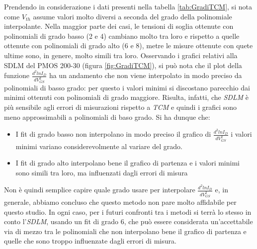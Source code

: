 \documentclass[12pt, letterpaper]{book}
\begin{document}
Prendendo in considerazione i dati presenti nella tabella \ref{tab:GradiTCM}, si nota come $V_{th}$ assume valori molto diversi a seconda del grado della polinomiale interpolante. Nella maggior parte dei casi, le tensioni di soglia ottenute con polinomiali di grado basso (2 e 4) cambiano molto tra loro e rispetto a quelle ottenute con polinomiali di grado alto (6 e 8), metre le misure ottenute con quete ultime sono, in genere, molto simili tra loro. Osservando i grafici relativi alla SDLM del PMOS 200-30 (figura \ref{fig:GradiTCM}), si può nota che il plot della funzione $\frac{d^2lnI_D}{dV_{GS}^2}$ ha un andamento che non viene interpolato in modo preciso da polinomiali di basso grado: per questo i valori minimi si discostano parecchio dai minimi ottenuti con polinomiali di grado maggiore. Risulta, infatti, che \emph{SDLM} è più sensibile agli errori di misurazioni rispetto a \emph{TCM} e quindi i grafici sono meno approssimabili a polinomiali di baso grado. Si ha dunque che:
\begin{itemize}
  \item I fit di grado basso non interpolano in modo preciso il grafico di $\frac{d^2lnI_D}{dV_{GS}^2}$ i valori minimi variano considerevolmente al variare del grado.
  \item I fit di grado alto interpolano bene il grafico di partenza e i valori minimi sono simili tra loro, ma influenzati dagli errori di misura
\end{itemize}

Non è quindi semplice capire quale grado usare per interpolare $\frac{d^2lnI_D}{dV_{GS}^2}$ e, in generale, abbiamo concluso che questo metodo non pare molto affidabile per questo studio. In ogni caso, per i futuri confronti tra i metodi si terrà lo stesso in conto l'\emph{SDLM}, usando un fit di grado 6, che può essere considerata un'accettabile via di mezzo tra le polinomiali che non interpolano bene il grafico di partenza e quelle che sono troppo influenzate dagli errori di misura.
\end{document}
